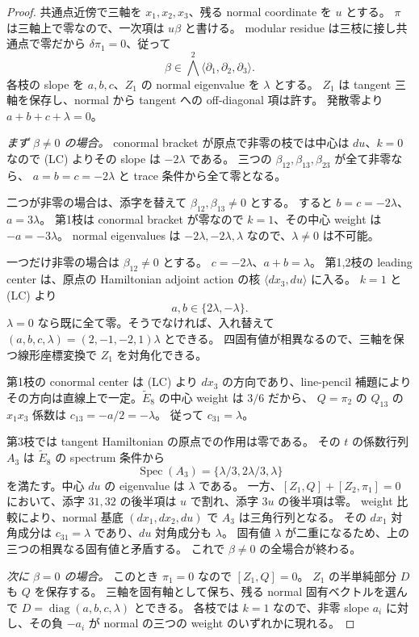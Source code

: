 \begin{proof}
共通点近傍で三軸を $x_1,x_2,x_3$、残る normal coordinate を $u$ とする。
$\pi$ は三軸上で零なので、一次項は $u\beta$ と書ける。
modular residue は三枝に接し共通点で零だから $\delta\pi_1=0$、従って
\[
 \beta\in\bigwedge^2\langle\partial_1,\partial_2,\partial_3\rangle.
\]
各枝の slope を $a,b,c$、$Z_1$ の normal eigenvalue を $\lambda$ とする。
$Z_1$ は tangent 三軸を保存し、normal から tangent への off-diagonal 項は許す。
発散零より $a+b+c+\lambda=0$。

\emph{まず $\beta\ne0$ の場合。}
conormal bracket が原点で非零の枝では中心は $du$、$k=0$ なので
(LC) よりその slope は $-2\lambda$ である。
三つの $\beta_{12},\beta_{13},\beta_{23}$ が全て非零なら、
$a=b=c=-2\lambda$ と trace 条件から全て零となる。

二つが非零の場合は、添字を替えて $\beta_{12},\beta_{13}\ne0$ とする。
すると $b=c=-2\lambda$、$a=3\lambda$。
第1枝は conormal bracket が零なので $k=1$、その中心 weight は $-a=-3\lambda$。
normal eigenvalues は $-2\lambda,-2\lambda,\lambda$ なので、$\lambda\ne0$ は不可能。

一つだけ非零の場合は $\beta_{12}\ne0$ とする。
$c=-2\lambda$、$a+b=\lambda$。
第1,2枝の leading center は、原点の Hamiltonian adjoint action の核
$\langle dx_3,du\rangle$ に入る。
$k=1$ と (LC) より
\[
 a,b\in\{2\lambda,-\lambda\}.
\]
$\lambda=0$ なら既に全て零。そうでなければ、入れ替えて
$(a,b,c,\lambda)=(2,-1,-2,1)\lambda$ とできる。
四固有値が相異なるので、三軸を保つ線形座標変換で $Z_1$ を対角化できる。

第1枝の conormal center は (LC) より $dx_3$ の方向であり、line-pencil 補題により
その方向は直線上で一定。$\widetilde E_8$ の中心 weight は $3/6$ だから、
$Q=\pi_2$ の $Q_{13}$ の $x_1x_3$ 係数は $c_{13}=-a/2=-\lambda$。
従って $c_{31}=\lambda$。

第3枝では tangent Hamiltonian の原点での作用は零である。
その $t$ の係数行列 $A_3$ は $\widetilde E_8$ の spectrum 条件から
\[
 \operatorname{Spec}(A_3)=\{\lambda/3,2\lambda/3,\lambda\}
\]
を満たす。中心 $du$ の eigenvalue は $\lambda$ である。
一方、$[Z_1,Q]+[Z_2,\pi_1]=0$ において、添字 $31,32$ の後半項は
$u$ で割れ、添字 $3u$ の後半項は零。
weight 比較により、normal 基底 $(dx_1,dx_2,du)$ で $A_3$ は三角行列となる。
その $dx_1$ 対角成分は $c_{31}=\lambda$ であり、$du$ 対角成分も $\lambda$。
固有値 $\lambda$ が二重になるため、上の三つの相異なる固有値と矛盾する。
これで $\beta\ne0$ の全場合が終わる。

\emph{次に $\beta=0$ の場合。}
このとき $\pi_1=0$ なので $[Z_1,Q]=0$。
$Z_1$ の半単純部分 $D$ も $Q$ を保存する。
三軸を固有軸として保ち、残る normal 固有ベクトルを選んで
$D=\operatorname{diag}(a,b,c,\lambda)$ とできる。
各枝では $k=1$ なので、非零 slope $a_i$ に対し、その負 $-a_i$ が
normal の三つの weight のいずれかに現れる。


\end{proof}
